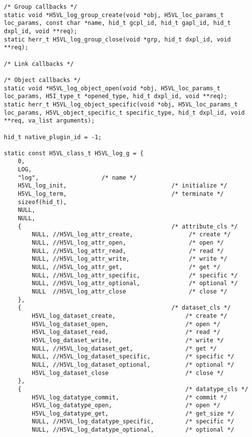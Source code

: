 \begin{appendices}
\begin{lstlisting}
/* Group callbacks */
static void *H5VL_log_group_create(void *obj, H5VL_loc_params_t loc_params, const char *name, hid_t gcpl_id, hid_t gapl_id, hid_t dxpl_id, void **req);
static herr_t H5VL_log_group_close(void *grp, hid_t dxpl_id, void **req);

/* Link callbacks */

/* Object callbacks */
static void *H5VL_log_object_open(void *obj, H5VL_loc_params_t loc_params, H5I_type_t *opened_type, hid_t dxpl_id, void **req);
static herr_t H5VL_log_object_specific(void *obj, H5VL_loc_params_t loc_params, H5VL_object_specific_t specific_type, hid_t dxpl_id, void **req, va_list arguments);

hid_t native_plugin_id = -1;

static const H5VL_class_t H5VL_log_g = {
    0,
    LOG,
    "log",					/* name */
    H5VL_log_init,                              /* initialize */
    H5VL_log_term,                              /* terminate */
    sizeof(hid_t),
    NULL,
    NULL,
    {                                           /* attribute_cls */
        NULL, //H5VL_log_attr_create,                /* create */
        NULL, //H5VL_log_attr_open,                  /* open */
        NULL, //H5VL_log_attr_read,                  /* read */
        NULL, //H5VL_log_attr_write,                 /* write */
        NULL, //H5VL_log_attr_get,                   /* get */
        NULL, //H5VL_log_attr_specific,              /* specific */
        NULL, //H5VL_log_attr_optional,              /* optional */
        NULL  //H5VL_log_attr_close                  /* close */
    },
    {                                           /* dataset_cls */
        H5VL_log_dataset_create,                    /* create */
        H5VL_log_dataset_open,                      /* open */
        H5VL_log_dataset_read,                      /* read */
        H5VL_log_dataset_write,                     /* write */
        NULL, //H5VL_log_dataset_get,               /* get */
        NULL, //H5VL_log_dataset_specific,          /* specific */
        NULL, //H5VL_log_dataset_optional,          /* optional */
        H5VL_log_dataset_close                      /* close */
    },
    {                                               /* datatype_cls */
        H5VL_log_datatype_commit,                   /* commit */
        H5VL_log_datatype_open,                     /* open */
        H5VL_log_datatype_get,                      /* get_size */
        NULL, //H5VL_log_datatype_specific,         /* specific */
        NULL, //H5VL_log_datatype_optional,         /* optional */

\end{lstlisting}
\end{appendices}
